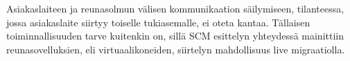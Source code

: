 Asiakaslaiteen ja reunasolmun välisen kommunikaation säilymiseen, tilanteessa, jossa asiakaslaite siirtyy toiselle tukiasemalle, ei oteta kantaa. 
Tällaisen toiminnallisuuden tarve kuitenkin on, sillä SCM esittelyn yhteydessä mainittiin reunasovelluksien, eli virtuaalikoneiden, siirtelyn mahdollisuus live migraatiolla.
%
%


